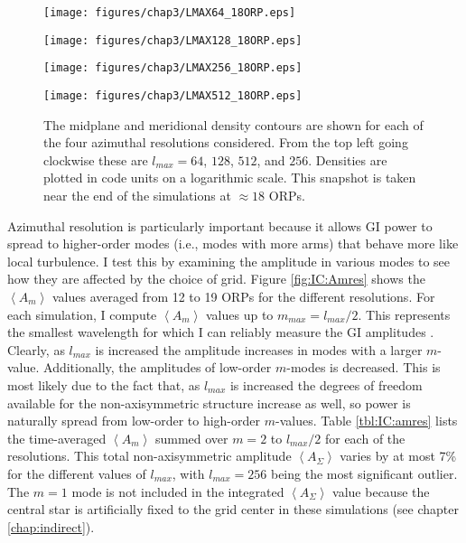 \begin{figure}[p]
\begin{minipage}{0.5\linewidth}
\centering
\texttt{[image: figures/chap3/LMAX64\_18ORP.eps]}
\end{minipage}
\hspace{0.25in}
\begin{minipage}{0.5\linewidth}
\centering
\texttt{[image: figures/chap3/LMAX128\_18ORP.eps]}
\end{minipage}
\vspace{0.5in}


\begin{minipage}{0.5\linewidth}
\centering
\texttt{[image: figures/chap3/LMAX256\_18ORP.eps]}
\end{minipage}
\hspace{0.25in}
\begin{minipage}{0.5\linewidth}
\centering
\texttt{[image: figures/chap3/LMAX512\_18ORP.eps]}
\end{minipage}
\caption[Midplane and meridional densities for varied azimuthal resolutions]{The midplane and meridional density contours are shown for each of the four azimuthal resolutions considered. From the top left going clockwise these are $l_{max} = 64$, $128$, $512$, and $256$. Densities are plotted in code units on a logarithmic scale. This snapshot is taken near the end of the simulations at $\approx 18$ ORPs.}
\label{fig:IC:rescomp}
\end{figure}

Azimuthal resolution is particularly important because it allows GI power to spread to higher-order modes (i.e., modes with more arms) that behave more like local turbulence. I test this by examining the amplitude in various modes to see how they are affected by the choice of grid. Figure \ref{fig:IC:Amres} shows the $\left< A_m \right>$ values averaged from 12 to 19 ORPs for the different resolutions. For each simulation, I compute $\left< A_m \right>$ values up to $m_{max} = l_{max}/2$. This represents the smallest wavelength for which I can reliably measure the GI amplitudes \citep{shannon1984}. Clearly, as $l_{max}$ is increased the amplitude increases in modes with a larger $m$-value. Additionally, the amplitudes of low-order $m$-modes is decreased. This is most likely due to the fact that, as $l_{max}$ is increased the degrees of freedom available for the non-axisymmetric structure increase as well, so power is naturally spread from low-order to high-order $m$-values. Table \ref{tbl:IC:amres} lists the time-averaged $\left< A_m \right>$ summed over $m = 2$ to $l_{max}/2$ for each of the resolutions. This total non-axisymmetric amplitude $\left<A_\Sigma\right>$ varies by at most 7\% for the different values of $l_{max}$, with $l_{max} = 256$ being the most significant outlier. The $m = 1$ mode is not included in the integrated $\left<A_\Sigma\right>$ value because the central star is artificially fixed to the grid center in these simulations (see chapter \ref{chap:indirect}). 

